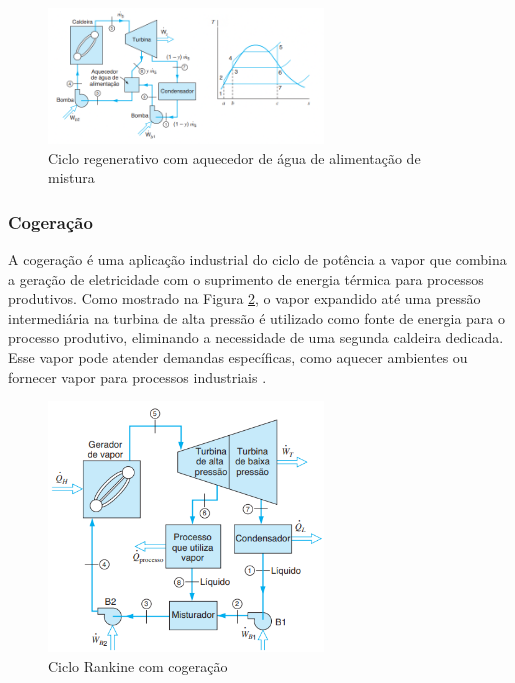 \documentclass[
	article,			%
	11pt,				%
	oneside,			%
	a4paper,			%
	english,			%
	brazil,				%
	sumario=tradicional
	]{abntex2}
\begin{document}
\begin{figure}[h]
	\centering
	\includegraphics[width=0.65\textwidth]{./images/regenerativo-aquecedor.png}
	\caption{Ciclo regenerativo com aquecedor de água de alimentação de mistura}
	\label{fig:reg-aquecedor}
\end{figure}

\subsubsection{Cogeração}

A cogeração é uma aplicação industrial do ciclo de potência a vapor que combina a geração de eletricidade com o suprimento de energia térmica para processos produtivos. Como mostrado na Figura \ref{fig:cogeracao}, o vapor expandido até uma pressão intermediária na turbina de alta pressão é utilizado como fonte de energia para o processo produtivo, eliminando a necessidade de uma segunda caldeira dedicada. Esse vapor pode atender demandas específicas, como aquecer ambientes ou fornecer vapor para processos industriais \cite{borgnakke-2020}.

\begin{figure}[h]
	\centering
	\includegraphics[width=0.65\textwidth]{./images/cogeracao.png}
	\caption{Ciclo Rankine com cogeração}
	\label{fig:cogeracao}
\end{figure}
\end{document}

